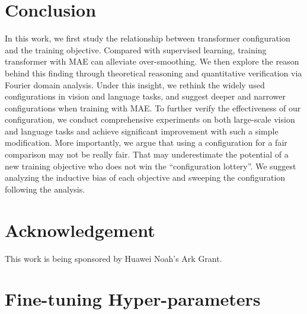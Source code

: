 \documentclass{article}
\theoremstyle{plain}
\theoremstyle{definition}
\theoremstyle{remark}
\begin{document}
\section{Conclusion}\label{Conclusion}


In this work, we first study the relationship between transformer configuration and the training objective. Compared with supervised learning, training transformer with MAE can alleviate over-smoothing. We then explore the reason behind this finding through theoretical reasoning and quantitative verification via Fourier domain analysis. Under this insight, we rethink the widely used configurations in vision and language tasks, and suggest deeper and narrower configurations when training with MAE. To further verify the effectiveness of our configuration, we conduct comprehensive experiments on both large-scale vision and language tasks and achieve significant improvement with such a simple modification. More importantly, we argue that using a configuration for a fair comparison may not be really fair. That may underestimate the potential of a new training objective who does not win the ``configuration lottery''. We suggest analyzing the inductive bias of each objective and sweeping the configuration following the analysis. 


\section*{Acknowledgement}
This work is being sponsored by Huawei Noah's Ark Grant.





\newpage
\appendix
\onecolumn



\section{Fine-tuning Hyper-parameters}\label{appendix:hyper-parameter}
\end{document}
